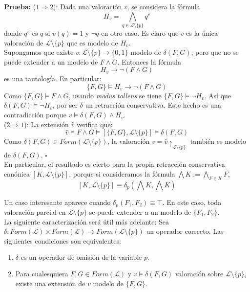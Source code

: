 \noindent \textbf{Prueba: } ($1 \Rightarrow 2$): Dada una valoración $v$, se considera la fórmula 
$$H_v = \bigwedge_{q \in \mathcal{L} \setminus \{ p \}} q^v$$
donde $q^v$ es $q$ si $v(q)=1$ y $\neg q$ en otro caso. Es claro que $v$ es la única valoración de $\mathcal{L} \setminus \{ p \}$ que es modelo de $H_v$. \\
Supongamos que existe $v  :\mathcal{L} \setminus \{p\} \rightarrow \{ 0,1 \}$ modelo de $\delta (F,G)$, pero que no se puede extender a un modelo de $F \wedge G$. Entonces la fórmula $$H_v \rightarrow \neg (F \wedge G)$$ es una tautología. En particular:
$$ \{ F,G \} \vDash H_v \rightarrow \neg (F \wedge G)$$
Como $ \{ F,G \} \vDash F \wedge G$, usando \textit{modus tollens} se tiene $\{ F,G \} \vDash \neg H_v$. Así que $\delta (F,G) \vDash \neg H_v$, por ser $\delta$ un retracción conservativa. Este hecho es una contradicción porque $v \vDash \delta (F,G) \wedge H_v$.\\
($2 \Rightarrow 1$): La extensión $\hat{v}$ verifica que:
$$\hat{v} \vDash F \wedge G \vDash [\{ F,G \} , \mathcal{L} \setminus \{ p \} ] \vDash \delta (F,G)$$
Como $\delta (F,G) \in Form(\mathcal{L} \setminus \{ p \})$, la valoración $v = \hat{v} \upharpoonright_{\mathcal{L} \setminus \{ p \}}$ también es modelo de $\delta (F,G)$. \hspace{14cm} $\square$ \\

En particular, el resultado es cierto para la propia retracción conservativa canónica $[K, \mathcal{L} \setminus \{ p \}]$, porque si consideramos la fórmula $\bigwedge K := \bigwedge_{F \in K} F$,
$$[K, \mathcal{L} \setminus \{ p \}] \equiv \delta_p (\bigwedge K , \bigwedge K)$$

Un caso interesante aparece cuando $\delta_p(F_1,F_2) \equiv \top$. En este caso, toda valoración parcial en $\mathcal{L} \setminus \{ p \}$ se puede extender a un modelo de $\{ F_1,F_2 \}$.\\

\newpage
La siguiente caracterización será útil más adelante:
\cor \label{cor:robusto} Sea $\delta : Form(\mathcal{L}) \times Form(\mathcal{L}) \longrightarrow Form(\mathcal{L} \setminus \{ p \})$ un operador correcto. Las siguientes condiciones son equivalentes:
\begin{enumerate}
\item $\delta$ es un operador de omisión de la variable $p$.
\item Para cualesquiera $F,G \in Form(\mathcal{L})$ y $v \vDash \delta (F,G) $ valoración sobre $\mathcal{L} \setminus \{ p \}$, existe una extensión de $v$ modelo de $\{ F,G \}$.
\end{enumerate}

